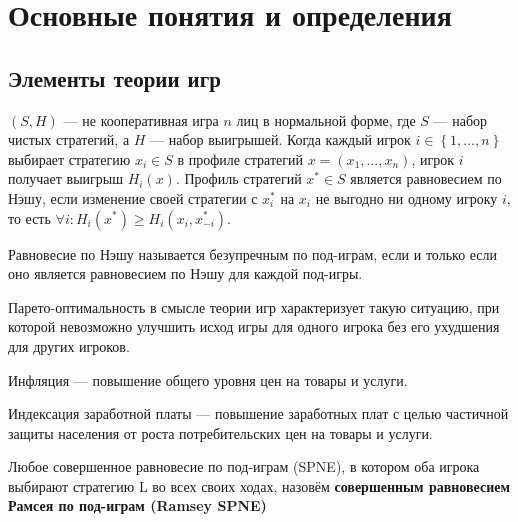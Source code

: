 \section{Основные понятия и определения}
\subsection{Элементы теории игр}

\begin{definition}
	$(S,H)$ --- не кооперативная игра $n$ лиц в нормальной
	форме, где $S$ --- набор чистых стратегий, а $H$ --- набор выигрышей. Когда
	каждый игрок $i \in \left\{1,\dots,n\right\}$  выбирает стратегию $x_i
	\in S$  в профиле стратегий $x=(x_1,\dots,x_n)$, игрок $i$  получает
	выигрыш $H_i(x)$. Профиль стратегий $x^* \in S$   является равновесием
	по Нэшу, если изменение своей стратегии с $x_i^*$  на $x_i$  не выгодно
	ни одному игроку $i$, то есть $\forall i : H_i(x^*) \geqslant H_i(x_i,
	x_{-i}^*)$.
\end{definition}
	
\begin{definition}
	Равновесие по Нэшу называется безупречным по под-играм, если и только если оно
	является равновесием по Нэшу для каждой под-игры. 
\end{definition}

\begin{definition}
Парето-оптимальность в смысле теории игр характеризует такую ситуацию, при которой невозможно улучшить исход игры для одного игрока без его ухудшения для других игроков.
\end{definition}

\begin{definition}
	Инфляция --- повышение общего уровня цен на товары и услуги.
\end{definition}

\begin{definition}
	Индексация заработной платы --- повышение заработных плат с целью частичной защиты населения от роста потребительских цен на товары и услуги.
\end{definition}

\begin{definition}
	Любое совершенное равновесие по под-играм (SPNE), в котором оба игрока выбирают стратегию L во всех своих ходах, назовём \textbf{совершенным равновесием Рамсея по под-играм (Ramsey SPNE)}~\cite{libich2008macroeconomic}
\end{definition}

